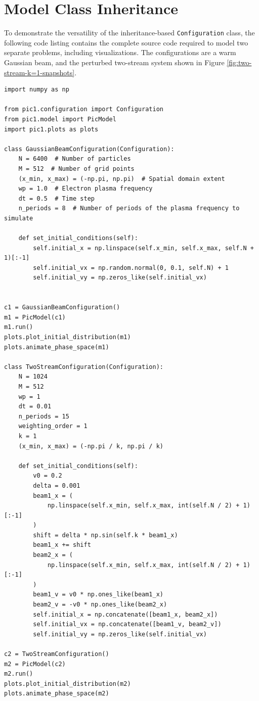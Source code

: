 \documentclass[%
 reprint,
 amsmath,amssymb,
 aps,
]{revtex4-2}
\begin{document}
\nocite{*}


\onecolumngrid

\pagebreak

\appendix

\section{Model Class Inheritance}

To demonstrate the versatility of the inheritance-based \texttt{Configuration} class, the following code listing contains the complete source code required to model two separate problems, including visualizations. The configurations are a warm Gaussian beam, and the perturbed two-stream system shown in Figure \ref{fig:two-stream-k=1-snapshots}.

\begin{lstlisting}[basicstyle=\small]
import numpy as np

from pic1.configuration import Configuration
from pic1.model import PicModel
import pic1.plots as plots

class GaussianBeamConfiguration(Configuration):
    N = 6400  # Number of particles
    M = 512  # Number of grid points
    (x_min, x_max) = (-np.pi, np.pi)  # Spatial domain extent
    wp = 1.0  # Electron plasma frequency
    dt = 0.5  # Time step
    n_periods = 8  # Number of periods of the plasma frequency to simulate

    def set_initial_conditions(self):
        self.initial_x = np.linspace(self.x_min, self.x_max, self.N + 1)[:-1]
        self.initial_vx = np.random.normal(0, 0.1, self.N) + 1
        self.initial_vy = np.zeros_like(self.initial_vx)


c1 = GaussianBeamConfiguration()
m1 = PicModel(c1)
m1.run()
plots.plot_initial_distribution(m1)
plots.animate_phase_space(m1)

class TwoStreamConfiguration(Configuration):
    N = 1024
    M = 512
    wp = 1
    dt = 0.01
    n_periods = 15
    weighting_order = 1
    k = 1
    (x_min, x_max) = (-np.pi / k, np.pi / k)

    def set_initial_conditions(self):
        v0 = 0.2
        delta = 0.001
        beam1_x = (
            np.linspace(self.x_min, self.x_max, int(self.N / 2) + 1)[:-1]
        )
        shift = delta * np.sin(self.k * beam1_x)
        beam1_x += shift
        beam2_x = (
            np.linspace(self.x_min, self.x_max, int(self.N / 2) + 1)[:-1]
        )
        beam1_v = v0 * np.ones_like(beam1_x)
        beam2_v = -v0 * np.ones_like(beam2_x)
        self.initial_x = np.concatenate([beam1_x, beam2_x])
        self.initial_vx = np.concatenate([beam1_v, beam2_v])
        self.initial_vy = np.zeros_like(self.initial_vx)

c2 = TwoStreamConfiguration()
m2 = PicModel(c2)
m2.run()
plots.plot_initial_distribution(m2)
plots.animate_phase_space(m2)
\end{lstlisting}
\end{document}
